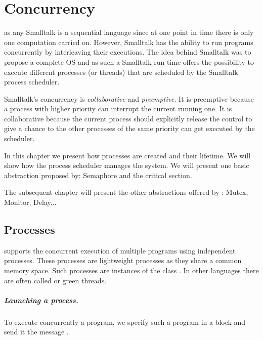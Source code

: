 \documentclass[a4paper,10pt,twoside]{book}
\begin{document}
\fi
\sloppy
\chapter{Concurrency}

\pharo as any Smalltalk is a sequential language since at one point in time there is only 
one computation carried on. However, Smalltalk has the ability to run programs concurrently by interleaving their executions. The idea behind Smalltalk was to propose a complete OS and as such a Smalltalk run-time offers the possibility to execute different processes (or threads) that are scheduled by the Smalltalk process scheduler. 

Smalltalk's concurrency is \emph{collaborative} and \emph{preemptive}. It is preemptive because a process with higher priority can interrupt the current running one. It is collaborative because the current process should explicitly release the control to give a chance to the other processes of the same priority can get executed by the scheduler. 

In this chapter we present how processes are created and their lifetime. We will show how the process scheduler manages the system. We will present one basic abstraction proposed by:  Semaphore and the critical section. 

The subsequent chapter will present the other abstractions offered by \pharo: Mutex, Monitor, Delay...


\section{Processes}
\pharo supports the concurrent execution of multiple programs using independent processes. These processes are lightweight processes as they share a common memory space. Such processes are instances of the class . In other languages there are often called  or green threads.

\paragraph{Launching a process. }
To execute concurrently a program, we specify such a program in a block and send it the message .
\end{document}
